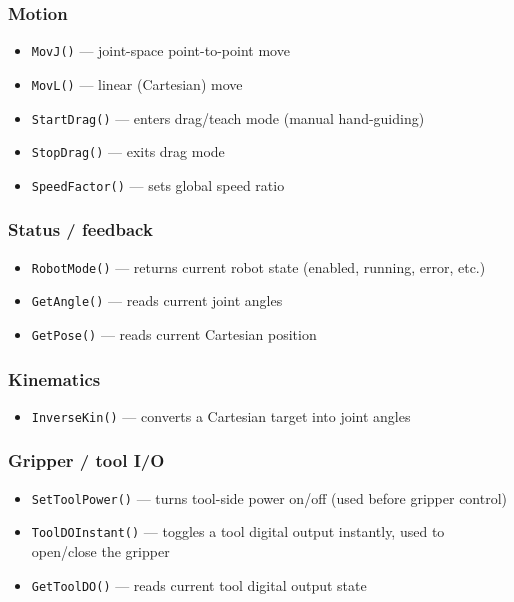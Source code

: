 \documentclass[11pt,a4paper]{article}
\newcommand{\code}[1]{\lstinline[style=inline]{#1}}
\begin{document}
\subsubsection*{Motion}
\begin{itemize}[leftmargin=1.2cm]
    \item \code{MovJ()} --- joint-space point-to-point move
    \item \code{MovL()} --- linear (Cartesian) move
    \item \code{StartDrag()} --- enters drag/teach mode (manual hand-guiding)
    \item \code{StopDrag()} --- exits drag mode
    \item \code{SpeedFactor()} --- sets global speed ratio
\end{itemize}

\subsubsection*{Status / feedback}
\begin{itemize}[leftmargin=1.2cm]
    \item \code{RobotMode()} --- returns current robot state (enabled, running, error, etc.)
    \item \code{GetAngle()} --- reads current joint angles
    \item \code{GetPose()} --- reads current Cartesian position
\end{itemize}

\subsubsection*{Kinematics}
\begin{itemize}[leftmargin=1.2cm]
    \item \code{InverseKin()} --- converts a Cartesian target into joint angles
\end{itemize}

\subsubsection*{Gripper / tool I/O}
\begin{itemize}[leftmargin=1.2cm]
    \item \code{SetToolPower()} --- turns tool-side power on/off (used before gripper control)
    \item \code{ToolDOInstant()} --- toggles a tool digital output instantly, used to open/close the gripper
    \item \code{GetToolDO()} --- reads current tool digital output state
\end{itemize}
\end{document}
